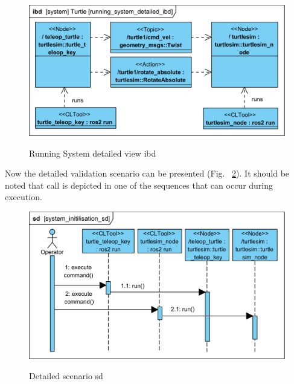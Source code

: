 \documentclass[11pt,oneside,a4paper]{report}
\begin{document}
\begin{figure}[H]
	\centering
	\begin{center}
		{\includegraphics[scale=.9]{diagrams/running_system_detailed_ibd.png}}
	\end{center}
	\caption{Running System detailed view ibd}
	\label{fig:running_system_detailed_ibd}
\end{figure}
			
Now the detailed validation scenario can be presented (Fig.~ \ref{fig:system_initilisation_sd}). It should be noted that \stAction{} call is depicted in one of the sequences that can occur during \stSystem{} execution.
			
\begin{figure}[H]
	\centering
	\begin{center}
		{\includegraphics[scale=.9]{diagrams/system_initilisation_sd.png}}
	\end{center}
	\caption{Detailed scenario sd}
	\label{fig:system_initilisation_sd}
\end{figure}
\end{document}
